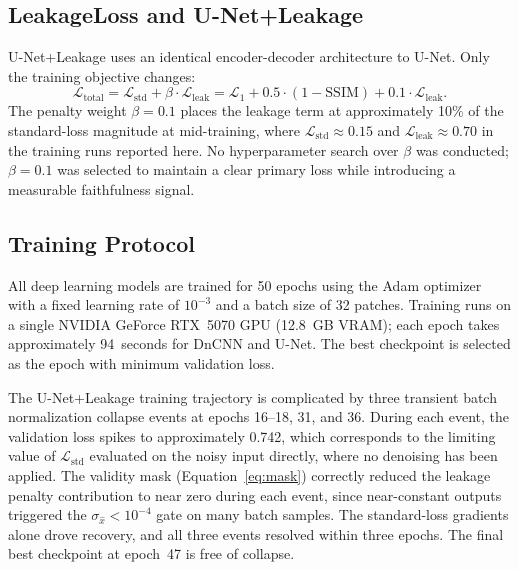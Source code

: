 \documentclass[review,12pt]{elsarticle}
\begin{document}
\subsection{LeakageLoss and U-Net+Leakage}
\label{sec:methods:leakageloss}

U-Net+Leakage uses an identical encoder-decoder architecture to U-Net.
Only the training objective changes:
\begin{equation}
  \mathcal{L}_{\mathrm{total}} =
  \mathcal{L}_{\mathrm{std}} + \beta \cdot \mathcal{L}_{\mathrm{leak}} =
  \mathcal{L}_{1} + 0.5\cdot(1 - \mathrm{SSIM}) +
  0.1 \cdot \mathcal{L}_{\mathrm{leak}}.
  \label{eq:leakageloss}
\end{equation}
The penalty weight $\beta = 0.1$ places the leakage term at
approximately 10\% of the standard-loss magnitude at mid-training,
where $\mathcal{L}_{\mathrm{std}} \approx 0.15$ and
$\mathcal{L}_{\mathrm{leak}} \approx 0.70$ in the training runs
reported here.  No hyperparameter search over $\beta$ was conducted;
$\beta = 0.1$ was selected to maintain a clear primary loss while
introducing a measurable faithfulness signal.

\subsection{Training Protocol}
\label{sec:methods:training}

All deep learning models are trained for 50 epochs using the Adam
optimizer with a fixed learning rate of $10^{-3}$ and a batch size of
32 patches.  Training runs on a single NVIDIA GeForce RTX~5070 GPU
(12.8~GB VRAM); each epoch takes approximately 94~seconds for DnCNN and
U-Net.  The best checkpoint is selected as the epoch with minimum
validation loss.

The U-Net+Leakage training trajectory is complicated by three transient
batch normalization collapse events at epochs 16--18, 31, and 36.
During each event, the validation loss spikes to approximately 0.742,
which corresponds to the limiting value of
$\mathcal{L}_{\mathrm{std}}$ evaluated on the noisy input directly,
where no denoising has been applied.  The validity mask (Equation~\ref{eq:mask}) correctly reduced the leakage penalty contribution to
near zero during each event, since near-constant outputs triggered the
$\sigma_{\hat{x}} < 10^{-4}$ gate on many batch samples.  The standard-loss
gradients alone drove recovery, and all three events resolved within
three epochs.  The final best checkpoint at epoch~47 is free of collapse.
\end{document}
